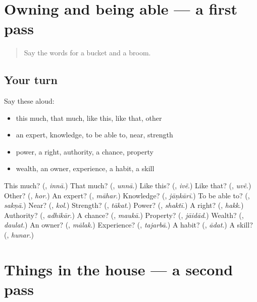 \section[(dialogue)]{Owning and being able — a first pass}

\label{lesson:PA-R116-first-pass-owning-and-being-able}



\begin{quote}
Say the words for a bucket and a broom.
\end{quote}

\subsection*{Your turn}
Say these aloud:

\begin{itemize}
\raggedright
  \item this much, that much, like this, like that, other
  \item an expert, knowledge, to be able to, near, strength
  \item power, a right, authority, a chance, property
  \item wealth, an owner, experience, a habit, a skill
\end{itemize}

\begin{tcolorbox}[breakable,colback=teal!4,colframe=teal!35!black,title={Before you move on}]
This much? (\textbf{}, \emph{innā}.) That much? (\textbf{}, \emph{unnā}.) Like this? (\textbf{}, \emph{ivẽ}.) Like that? (\textbf{}, \emph{uvẽ}.) Other? (\textbf{}, \emph{hor}.) An expert? (\textbf{}, \emph{māhar}.) Knowledge? (\textbf{}, \emph{jāṇkārī}.) To be able to? (\textbf{}, \emph{sakṇā}.) Near? (\textbf{}, \emph{kol}.) Strength? (\textbf{}, \emph{tākat}.) Power? (\textbf{}, \emph{shaktī}.) A right? (\textbf{}, \emph{hakk}.) Authority? (\textbf{}, \emph{adhikār}.) A chance? (\textbf{}, \emph{maukā}.) Property? (\textbf{}, \emph{jāidād}.) Wealth? (\textbf{}, \emph{daulat}.) An owner? (\textbf{}, \emph{mālak}.) Experience? (\textbf{}, \emph{tajarbā}.) A habit? (\textbf{}, \emph{ādat}.) A skill? (\textbf{}, \emph{hunar}.)
\end{tcolorbox}
\section[(dialogue)]{Things in the house — a second pass}

